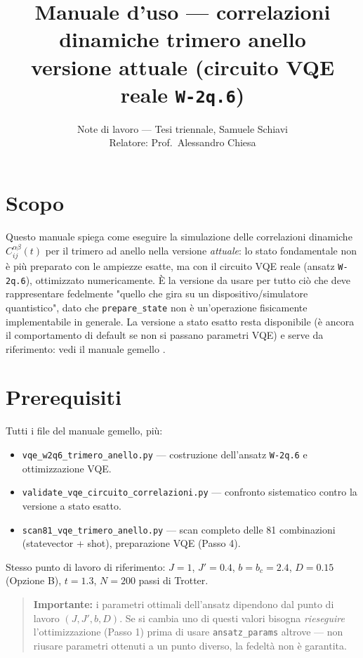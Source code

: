 \documentclass[11pt,a4paper]{article}
\title{Manuale d'uso --- correlazioni dinamiche trimero anello\\
\large versione attuale (circuito VQE reale \texttt{W-2q.6})}
\author{Note di lavoro --- Tesi triennale, Samuele Schiavi\\ Relatore: Prof.\ Alessandro Chiesa}
\date{}
\begin{document}
\maketitle

\section*{Scopo}

Questo manuale spiega come eseguire la simulazione delle correlazioni dinamiche
$C_{ij}^{\alpha\beta}(t)$ per il trimero ad anello nella versione
\emph{attuale}: lo stato fondamentale non è più preparato con le ampiezze
esatte, ma con il circuito VQE reale (ansatz \texttt{W-2q.6}), ottimizzato
numericamente. È la versione da usare per tutto ciò che deve rappresentare
fedelmente "quello che gira su un dispositivo/simulatore quantistico", dato
che \texttt{prepare\_state} non è un'operazione fisicamente implementabile
in generale. La versione a stato esatto resta disponibile (è ancora il
comportamento di default se non si passano parametri VQE) e serve da
riferimento: vedi il manuale gemello
\texttt{}.

\section*{Prerequisiti}

Tutti i file del manuale gemello, più:
\begin{itemize}
\item \texttt{vqe\_w2q6\_trimero\_anello.py} --- costruzione dell'ansatz
\texttt{W-2q.6} e ottimizzazione VQE.
\item \texttt{validate\_vqe\_circuito\_correlazioni.py} --- confronto sistematico
contro la versione a stato esatto.
\item \texttt{scan81\_vqe\_trimero\_anello.py} --- scan completo delle 81
combinazioni (statevector + shot), preparazione VQE (Passo 4).
\end{itemize}
Stesso punto di lavoro di riferimento: $J=1$, $J'=0.4$, $b=b_c=2.4$,
$D=0.15$ (Opzione B), $t=1.3$, $N=200$ passi di Trotter.

\begin{quote}
\textbf{Importante:} i parametri ottimali dell'ansatz dipendono dal punto di
lavoro $(J,J',b,D)$. Se si cambia uno di questi valori bisogna
\emph{rieseguire} l'ottimizzazione (Passo 1) prima di usare
\texttt{ansatz\_params} altrove --- non riusare parametri ottenuti a un
punto diverso, la fedeltà non è garantita.
\end{quote}
\end{document}
